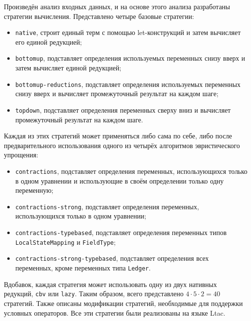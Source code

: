 \documentclass[../thesis.tex]{subfiles}
\begin{document}
Произведён анализ входных данных, и на основе этого анализа разработаны стратегии вычисления. Представлено четыре базовые стратегии:
\begin{itemize}
    \item \texttt{native}, строит единый терм с помощью let-конструкций и затем вычисляет его единой редукцией;
    \item \texttt{bottomup}, подставляет определения используемых переменных снизу вверх и затем вычисляет единой редукцией;
    \item \texttt{bottomup-reductions}, подставляет определения используемых переменных снизу вверх и вычисляет промежуточный результат на каждом шаге;
    \item \texttt{topdown}, подставляет определения переменных сверху вниз и вычисляет промежуточный результат на каждом шаге.
\end{itemize}

Каждая из этих стратегий может применяться либо сама по себе, либо после предварительного использования одного из четырёх алгоритмов эвристического упрощения:
\begin{itemize}
    \item \texttt{contractions}, подставляет определения переменных, использующихся только в одном уравнении и использующие в своём определении только одну переменную;
    \item \texttt{contractions-strong}, подставляет определения переменных, использующихся только в одном уравнении;
    \item \texttt{contractions-typebased}, подставляет определения переменных типов\\\texttt{LocalStateMapping} и \texttt{FieldType};
    \item \texttt{contractions-strong-typebased}, подставляет определения всех переменных, кроме переменных типа \texttt{Ledger}.
\end{itemize}

Вдобавок, каждая стратегия может использовать одну из двух нативных редукций, \texttt{cbv} или \texttt{lazy}. Таким образом, всего представлено $4 \cdot 5 \cdot 2 = 40$ стратегий. Также описаны модификации стратегий, необходимые для поддержки условных операторов. Все эти стратегии были реализованы на языке Ltac.
\end{document}
